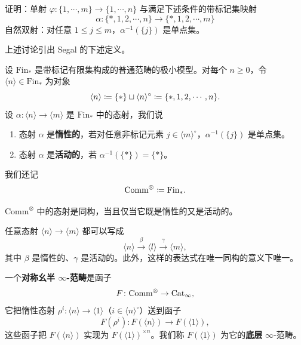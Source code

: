 \begin{exercise}\label{L21-1.4}
证明：单射 $\varphi\colon\{1,\cdots,m\}\to\{1,\cdots,n\}$ 与满足下述条件的带标记集映射
\[
\alpha\colon\{*,1,2,\cdots,n\}\to\{*,1,2,\cdots,m\}
\]
自然双射：对任意 $1\le j\le m$，$\alpha^{-1}(\{j\})$ 是单点集。
\end{exercise}

\nitem\label{L21-1.5} 上述讨论引出 Segal 的下述定义。

\begin{definition}\label{L21-1.6}
设 $\mathrm{Fin}_{*}$ 是带标记有限集构成的普通范畴的极小模型。对每个 $n\ge0$，令 $\langle n\rangle\in\mathrm{Fin}_{*}$ 为对象
\[
\langle n\rangle\coloneqq\{*\}\sqcup\langle n\rangle^{\circ}\coloneqq\{*,1,2,\cdots,n\}.
\]
设 $\alpha\colon\langle n\rangle\to\langle m\rangle$ 是 $\mathrm{Fin}_{*}$ 中的态射，我们说
\begin{enumerate}[label=(\arabic*),leftmargin=2.4em,itemsep=0.1em]
\item 态射 $\alpha$ 是\textbf{惰性的}，若对任意非标记元素 $j\in\langle m\rangle^{\circ}$，$\alpha^{-1}(\{j\})$ 是单点集。
\item 态射 $\alpha$ 是\textbf{活动的}，若 $\alpha^{-1}(\{*\})=\{*\}$。
\end{enumerate}
我们还记
\[
\mathrm{Comm}^{\otimes}\coloneqq\mathrm{Fin}_{*}.
\]
\end{definition}

\begin{exercise}\label{L21-1.7}
$\mathrm{Comm}^{\otimes}$ 中的态射是同构，当且仅当它既是惰性的又是活动的。
\end{exercise}

\begin{exercise}\label{L21-1.8}
任意态射 $\langle n\rangle\to\langle m\rangle$ 都可以写成
\[
\langle n\rangle\xrightarrow{\ \beta\ }\langle l\rangle\xrightarrow{\ \gamma\ }\langle m\rangle,
\]
其中 $\beta$ 是惰性的、$\gamma$ 是活动的。此外，这样的表达式在唯一同构的意义下唯一。
\end{exercise}

\begin{definition}\label{L21-1.9}
一个\textbf{对称幺半 $\infty$-范畴}是函子
\[
F\colon\mathrm{Comm}^{\otimes}\to\operatorname{Cat}_{\infty},
\]
它把惰性态射 $\rho^{i}\colon\langle n\rangle\to\langle 1\rangle$（$i\in\langle n\rangle^{\circ}$）送到函子
\[
F(\rho^{i})\colon F(\langle n\rangle)\to F(\langle 1\rangle),
\]
这些函子把 $F(\langle n\rangle)$ 实现为 $F(\langle 1\rangle)^{\times n}$。我们称 $F(\langle 1\rangle)$ 为它的\textbf{底层} $\infty$-范畴。
\end{definition}

